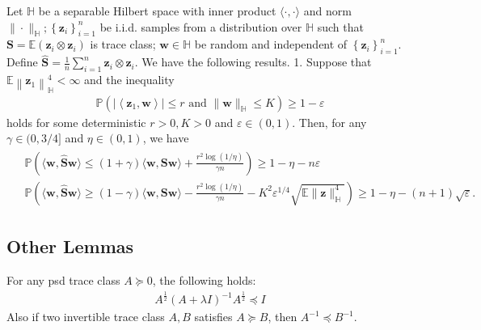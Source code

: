 \documentclass[12pt,a4paper,pdftex,onepage]{article}
\begin{document}
\begin{lemma}\label{lemma; key lemma in-sample population}
Let $\mathbb{H}$ be a separable Hilbert space with inner product $\langle\cdot, \cdot\rangle$ and norm $\|\cdot\|_{\mathbb{H}} ;\left\{\boldsymbol{z}_i\right\}_{i=1}^n$ be i.i.d. samples from a distribution over $\mathbb{H}$ such that $\boldsymbol{S}=\mathbb{E}\left(\boldsymbol{z}_i \otimes \boldsymbol{z}_i\right)$ is trace class; $\boldsymbol{w} \in \mathbb{H}$ be random and independent of $\left\{\boldsymbol{z}_i\right\}_{i=1}^n$. Define $\widehat{\boldsymbol{S}}=\frac{1}{n} \sum_{i=1}^n \boldsymbol{z}_i \otimes \boldsymbol{z}_i$. We have the following results.
1. Suppose that $\mathbb{E}\left\|\boldsymbol{z}_1\right\|_{\mathbb{H}}^4<\infty$ and the inequality
\begin{align*}
\mathbb{P}\left(\left|\left\langle\boldsymbol{z}_1, \boldsymbol{w}\right\rangle\right| \leq r \text { and }\|\boldsymbol{w}\|_{\mathbb{H}} \leq K\right) \geq 1-\varepsilon
\end{align*}
holds for some deterministic $r>0, K>0$ and $\varepsilon \in(0,1)$. Then, for any $\gamma \in(0,3 / 4]$ and $\eta \in(0,1)$, we have
\begin{align*}
\begin{aligned}
& \mathbb{P}\left(\langle\boldsymbol{w}, \widehat{\boldsymbol{S}} \boldsymbol{w}\rangle \leq(1+\gamma)\langle\boldsymbol{w}, \boldsymbol{S} \boldsymbol{w}\rangle+\frac{r^2 \log (1 / \eta)}{\gamma n}\right) \geq 1-\eta-n \varepsilon \\
& \mathbb{P}\left(\langle\boldsymbol{w}, \widehat{\boldsymbol{S}} \boldsymbol{w}\rangle \geq(1-\gamma)\langle\boldsymbol{w}, \boldsymbol{S} \boldsymbol{w}\rangle-\frac{r^2 \log (1 / \eta)}{\gamma n}-K^2 \varepsilon^{1 / 4} \sqrt{\mathbb{E}\|\boldsymbol{z}\|_{\mathbb{H}}^4}\right) \geq 1-\eta-(n+1) \sqrt{\varepsilon}.
\end{aligned}
\end{align*}

\end{lemma}

\subsection{Other Lemmas}
\begin{lemma}\label{lemma; matrix inverse inequality}\label{lemma; psd inverse inequality}
For any psd trace class $A \succeq 0$, the following holds: 
\begin{align*}
A^{\frac{1}{2}}(A+\lambda I)^{-1} A^{\frac{1}{2}} \preceq I
\end{align*}
Also if two invertible trace class $A,B$ satisfies $A \succeq B$, then $A^{-1} \preceq B^{-1}$.
\end{lemma}
\end{document}
